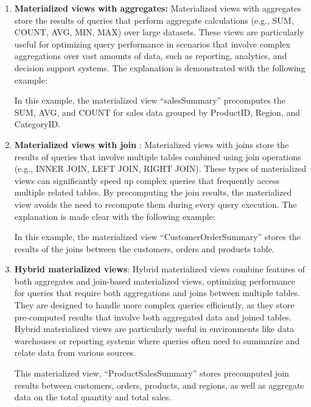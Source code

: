 \begin{enumerate}[label=\alph*)]
 \item\textbf{ Materialized views with aggregates:} Materialized views with aggregates store the results of queries that perform aggregate calculations (e.g., SUM, COUNT, AVG, MIN, MAX) over large datasets. These views are particularly useful for optimizing query performance in scenarios that involve complex aggregations over vast amounts of data, such as reporting, analytics, and decision support systems. The explanation is demonstrated with the following example:\vspace{.4cm}
    
    

    In this example, the materialized view ``salesSummary'' precomputes the SUM, AVG, and COUNT for sales data grouped by ProductID, Region, and CategoryID.

    \item\textbf{Materialized views with join }: Materialized views with joins store the results of queries that involve multiple tables combined using join operations (e.g., INNER JOIN, LEFT JOIN, RIGHT JOIN). These types of materialized views can significantly speed up complex queries that frequently access multiple related tables. By precomputing the join results, the materialized view avoids the need to recompute them during every query execution. The explanation is made clear with the following example: \vspace{.4cm}
    
    

    In this example, the materialized view ``CustomerOrderSummary''
    stores the results of the joins between the customers, orders and products table.
    
    \item \textbf{Hybrid materialized views}: Hybrid materialized views combine features of both aggregates and join-based materialized views, optimizing performance for queries that require both aggregations and joins between multiple tables. They are designed to handle more complex queries efficiently, as they store pre-computed results that involve both aggregated data and joined tables. Hybrid materialized views are particularly useful in environments like data warehouses or reporting systems where queries often need to summarize and relate data from various sources. \vspace{.4cm}
    
     
    
This materialized view, ``ProductSalesSummary'' stores precomputed join results between customers, orders, products, and regions, as well as aggregate data on the total quantity and total sales.
    
\end{enumerate}

